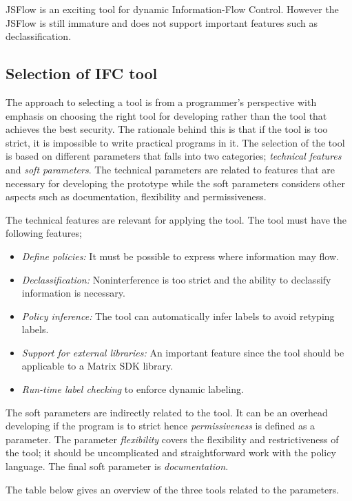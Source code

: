 JSFlow is an exciting tool for dynamic Information-Flow Control. However the JSFlow is still immature and does not support important features such as declassification.

\subsection{Selection of IFC tool}
The approach to selecting a tool is from a programmer's perspective with emphasis on choosing the right tool for developing rather than the tool that achieves the best security. The rationale behind this is that if the tool is too strict, it is impossible to write practical programs in it.
The selection of the tool is based on different parameters that falls into two categories; \emph{technical features} and \emph{soft parameters}. The technical parameters are related to features that are necessary for developing the prototype while the soft parameters considers other aspects such as documentation, flexibility and permissiveness.

The technical features are relevant for applying the tool. The tool must have the following features; 

\begin{itemize}
	\item \emph{Define policies:} It must be possible to express where information may flow.
	\item \emph{Declassification:} Noninterference is too strict and the ability to declassify information is necessary. 
	\item \emph{Policy inference:} The tool can automatically infer labels to avoid retyping labels.
	\item \emph{Support for external libraries:} An important feature since the tool should be applicable to a Matrix SDK library.
	\item \emph{Run-time label checking} to enforce dynamic labeling.
\end{itemize}

The soft parameters are indirectly related to the tool. It can be an overhead developing if the program is to strict hence \emph{permissiveness} is defined as a parameter. The parameter \emph{flexibility} covers the flexibility and restrictiveness of the tool; it should be uncomplicated and straightforward work with the policy language. The final soft parameter is \emph{documentation}.

The table below gives an overview of the three tools related to the parameters. 

